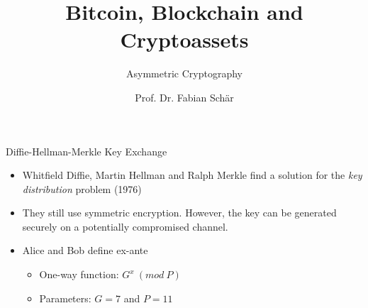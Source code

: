 \documentclass[handout]{beamer}
\title{Bitcoin, Blockchain and Cryptoassets}
\subtitle{Asymmetric Cryptography}
\author{Prof. Dr. Fabian Schär}
\institute{University of Basel}
\begin{document}
\thispagestyle{empty}
\begin{frame}[noframenumbering]
	\titlepage
\end{frame}

\begin{frame}{Diffie-Hellman-Merkle Key Exchange}
	\begin{itemize}
		\item<1-> Whitfield Diffie, Martin Hellman and Ralph Merkle find a solution for the \textit{key distribution} problem (1976)
		\item<2-> They still use symmetric encryption. However, the key can be generated securely on a potentially compromised channel. 
		\vspace{0.5cm}
		\item<3-> Alice and Bob define ex-ante
		\begin{itemize}
			\item<4-> One-way function: $G^x\ (mod\ P)$
			\item<5-> Parameters: $G = 7$ and $P = 11$
		\end{itemize}
	\end{itemize}
\end{frame}
\end{document}
